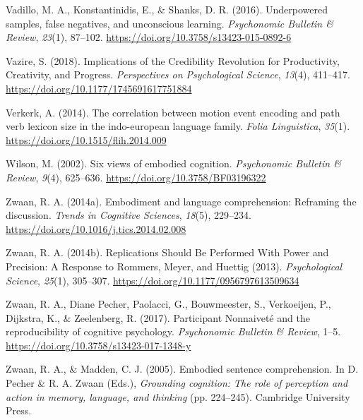 \documentclass[
  man,floatsintext]{apa7}
\newlength{\cslhangindent}
\newlength{\cslentryspacingunit} %
\newenvironment{CSLReferences}[2] %
 {%
  \setlength{\parindent}{0pt}
  \ifodd #1
  \let\oldpar\par
  \def\par{\hangindent=\cslhangindent\oldpar}
  \fi
  \setlength{\parskip}{#2\cslentryspacingunit}
 }%
 {}
\begin{document}
\begin{CSLReferences}{1}{0}
\leavevmode{}%
Vadillo, M. A., Konstantinidis, E., \& Shanks, D. R. (2016). Underpowered samples, false negatives, and unconscious learning. \emph{Psychonomic Bulletin \& Review}, \emph{23}(1), 87--102. \url{https://doi.org/10.3758/s13423-015-0892-6}

\leavevmode{}%
Vazire, S. (2018). Implications of the Credibility Revolution for Productivity, Creativity, and Progress. \emph{Perspectives on Psychological Science}, \emph{13}(4), 411--417. \url{https://doi.org/10.1177/1745691617751884}

\leavevmode{}%
Verkerk, A. (2014). The correlation between motion event encoding and path verb lexicon size in the indo-european language family. \emph{Folia Linguistica}, \emph{35}(1). \url{https://doi.org/10.1515/flih.2014.009}

\leavevmode{}%
Wilson, M. (2002). Six views of embodied cognition. \emph{Psychonomic Bulletin \& Review}, \emph{9}(4), 625--636. \url{https://doi.org/10.3758/BF03196322}

\leavevmode{}%
Zwaan, R. A. (2014a). Embodiment and language comprehension: Reframing the discussion. \emph{Trends in Cognitive Sciences}, \emph{18}(5), 229--234. \url{https://doi.org/10.1016/j.tics.2014.02.008}

\leavevmode{}%
Zwaan, R. A. (2014b). Replications {Should Be Performed With Power} and {Precision}: {A Response} to {Rommers}, {Meyer}, and {Huettig} (2013). \emph{Psychological Science}, \emph{25}(1), 305--307. \url{https://doi.org/10.1177/0956797613509634}

\leavevmode{}%
Zwaan, R. A., Diane Pecher, Paolacci, G., Bouwmeester, S., Verkoeijen, P., Dijkstra, K., \& Zeelenberg, R. (2017). Participant {Nonnaiveté} and the reproducibility of cognitive psychology. \emph{Psychonomic Bulletin \& Review}, 1--5. \url{https://doi.org/10.3758/s13423-017-1348-y}

\leavevmode{}%
Zwaan, R. A., \& Madden, C. J. (2005). Embodied sentence comprehension. In D. Pecher \& R. A. Zwaan (Eds.), \emph{Grounding cognition: {The} role of perception and action in memory, language, and thinking} (pp. 224--245). {Cambridge University Press}.


\end{CSLReferences}
\end{document}

